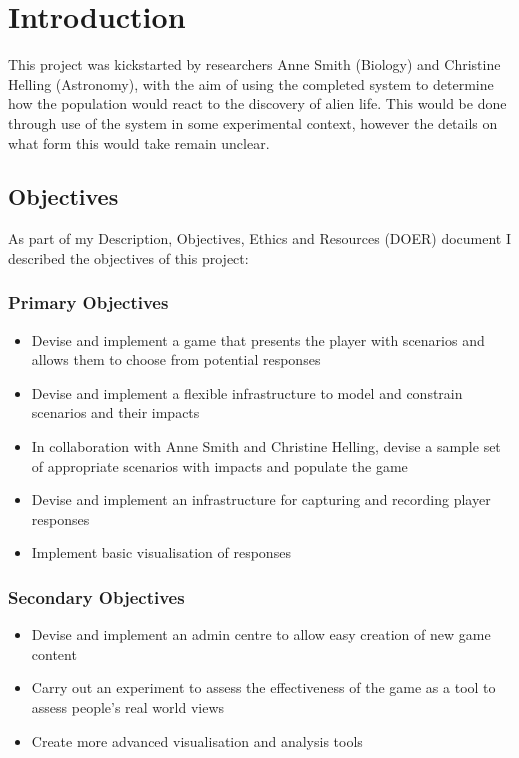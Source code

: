\chapter{Introduction}
This project was kickstarted by researchers Anne Smith (Biology) and Christine Helling (Astronomy), with the aim of using the completed system to determine how the population would react to the discovery of alien life. This would be done through use of the system in some experimental context, however the details on what form this would take remain unclear. 


\section{Objectives}
As part of my Description, Objectives, Ethics and Resources (DOER) document I described the objectives of this project:

\subsection{Primary Objectives}
\begin{itemize}
    \item Devise and implement a game that presents the player with scenarios and allows them to choose from potential responses
    \item Devise and implement a flexible infrastructure to model and constrain scenarios and their impacts
    \item In collaboration with Anne Smith and Christine Helling, devise a sample set of appropriate scenarios with impacts and populate the game
    \item Devise and implement an infrastructure for capturing and recording player responses
    \item Implement basic visualisation of responses
\end{itemize}
\subsection{Secondary Objectives}
\begin{itemize}
    \item Devise and implement an admin centre to allow easy creation of new game content
    \item Carry out an experiment to assess the effectiveness of the game as a tool to assess people's real world views
    \item Create more advanced visualisation and analysis tools
\end{itemize}
